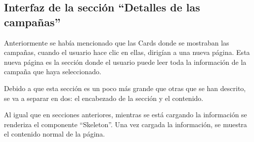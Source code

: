 \subsection{Interfaz de la sección ``Detalles de las campañas''}
Anteriormente se había mencionado que las Cards donde se mostraban las campañas, cuando el usuario hace clic en ellas, dirigían a una nueva página. Esta nueva página es la sección donde el usuario puede leer toda la información de la campaña que haya seleccionado.

Debido a que esta sección es un poco más grande que otras que se han descrito, se va a separar en dos: el encabezado de la sección y el contenido.

Al igual que en secciones anteriores, mientras se está cargando la información se renderiza el componente ``Skeleton''. Una vez cargada la información, se muestra el contenido normal de la página.
    
    